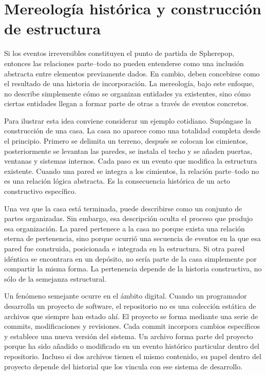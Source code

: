 \documentclass[12pt]{article}
\begin{document}
\section{Mereología histórica y construcción de estructura}

Si los eventos irreversibles constituyen el punto de partida de Spherepop, entonces las relaciones parte--todo no pueden entenderse como una inclusión abstracta entre elementos previamente dados. En cambio, deben concebirse como el resultado de una historia de incorporación. La mereología, bajo este enfoque, no describe simplemente cómo se organizan entidades ya existentes, sino cómo ciertas entidades llegan a formar parte de otras a través de eventos concretos.

Para ilustrar esta idea conviene considerar un ejemplo cotidiano. Supóngase la construcción de una casa. La casa no aparece como una totalidad completa desde el principio. Primero se delimita un terreno, después se colocan los cimientos, posteriormente se levantan las paredes, se instala el techo y se añaden puertas, ventanas y sistemas internos. Cada paso es un evento que modifica la estructura existente. Cuando una pared se integra a los cimientos, la relación parte--todo no es una relación lógica abstracta. Es la consecuencia histórica de un acto constructivo específico.

Una vez que la casa está terminada, puede describirse como un conjunto de partes organizadas. Sin embargo, esa descripción oculta el proceso que produjo esa organización. La pared pertenece a la casa no porque exista una relación eterna de pertenencia, sino porque ocurrió una secuencia de eventos en la que esa pared fue construida, posicionada e integrada en la estructura. Si otra pared idéntica se encontrara en un depósito, no sería parte de la casa simplemente por compartir la misma forma. La pertenencia depende de la historia constructiva, no sólo de la semejanza estructural.

Un fenómeno semejante ocurre en el ámbito digital. Cuando un programador desarrolla un proyecto de software, el repositorio no es una colección estática de archivos que siempre han estado ahí. El proyecto se forma mediante una serie de commits, modificaciones y revisiones. Cada commit incorpora cambios específicos y establece una nueva versión del sistema. Un archivo forma parte del proyecto porque ha sido añadido o modificado en un evento histórico particular dentro del repositorio. Incluso si dos archivos tienen el mismo contenido, su papel dentro del proyecto depende del historial que los vincula con ese sistema de desarrollo.
\end{document}
